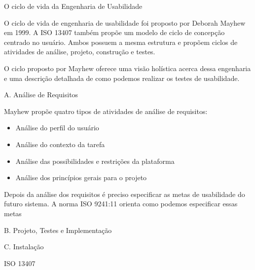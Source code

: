 O ciclo de vida da Engenharia de Usabilidade

	
	O ciclo de vida de engenharia de usabilidade foi proposto por Deborah Mayhew em 1999. 
A ISO 13407 também propõe um modelo de ciclo de concepção centrado no usuário. Ambos possuem a mesma estrutura e propõem ciclos de atividades de análise, projeto, construção e testes. ~\cite{cybis2010}

	

	O ciclo proposto por Mayhew oferece uma visão holística acerca dessa engenharia e uma descrição detalhada de como podemos realizar os testes de usabilidade. ~\cite{preece2005}

A. Análise de Requisitos

	Mayhew propõe quatro tipos de atividades de análise de requisitos: 

\begin{itemize}
\item Análise do perfil do usuário
\item Análise do contexto da tarefa
\item Análise das possibilidades e restrições da plataforma
\item Análise dos princípios gerais para o projeto
\end{itemize}

	Depois da análise dos requisitos é preciso especificar as metas de usabilidade do futuro sistema. A norma ISO 9241:11 orienta como podemos especificar essas metas

B. Projeto, Testes e Implementação

	

C. Instalação


ISO 13407


